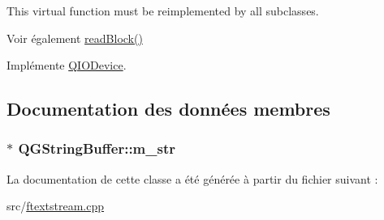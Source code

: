 This virtual function must be reimplemented by all subclasses.

\begin{DoxySeeAlso}{Voir également}
\hyperlink{class_q_g_string_buffer_aa5ab1052c6a1a9365418f55c55022fb2}{read\+Block()} 
\end{DoxySeeAlso}


Implémente \hyperlink{class_q_i_o_device_a5d937df1bde2f956872dd54e077807d1}{Q\+I\+O\+Device}.



\subsection{Documentation des données membres}
\hypertarget{class_q_g_string_buffer_a7ba16cdff0574da370cdc1bcf1cdf9ea}{}
\subsubsection[{m\+\_\+str}]{$\ast$ Q\+G\+String\+Buffer\+::m\+\_\+str\hspace{0.3cm}{\ttfamily [protected]}}\label{class_q_g_string_buffer_a7ba16cdff0574da370cdc1bcf1cdf9ea}


La documentation de cette classe a été générée à partir du fichier suivant \+:\begin{DoxyCompactItemize}
\item 
src/\hyperlink{ftextstream_8cpp}{ftextstream.\+cpp}\end{DoxyCompactItemize}
